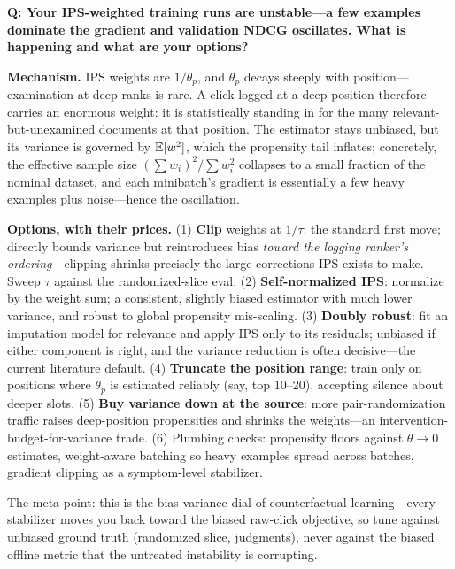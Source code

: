 \begin{interviewq}
\textbf{Q: Your IPS-weighted training runs are unstable---a few examples dominate the gradient and validation NDCG oscillates. What is happening and what are your options?}

 \quad {} \quad \badgefreq{\freqlow}

\stronganswer

\textbf{Mechanism.} IPS weights are $1/\theta_p$, and $\theta_p$ decays steeply with position---examination at deep ranks is rare. A click logged at a deep position therefore carries an enormous weight: it is statistically standing in for the many relevant-but-unexamined documents at that position. The estimator stays unbiased, but its variance is governed by $\operatorname{\mathbb{E}}[w^2]$, which the propensity tail inflates; concretely, the effective sample size $(\sum w_i)^2 / \sum w_i^2$ collapses to a small fraction of the nominal dataset, and each minibatch's gradient is essentially a few heavy examples plus noise---hence the oscillation.

\textbf{Options, with their prices.} (1) \textbf{Clip} weights at $1/\tau$: the standard first move; directly bounds variance but reintroduces bias \textit{toward the logging ranker's ordering}---clipping shrinks precisely the large corrections IPS exists to make. Sweep $\tau$ against the randomized-slice eval. (2) \textbf{Self-normalized IPS}: normalize by the weight sum; a consistent, slightly biased estimator with much lower variance, and robust to global propensity mis-scaling. (3) \textbf{Doubly robust}: fit an imputation model for relevance and apply IPS only to its residuals; unbiased if either component is right, and the variance reduction is often decisive---the current literature default. (4) \textbf{Truncate the position range}: train only on positions where $\theta_p$ is estimated reliably (say, top 10--20), accepting silence about deeper slots. (5) \textbf{Buy variance down at the source}: more pair-randomization traffic raises deep-position propensities and shrinks the weights---an intervention-budget-for-variance trade. (6) Plumbing checks: propensity floors against $\theta \to 0$ estimates, weight-aware batching so heavy examples spread across batches, gradient clipping as a symptom-level stabilizer.

The meta-point: this is the bias-variance dial of counterfactual learning---every stabilizer moves you back toward the biased raw-click objective, so tune against unbiased ground truth (randomized slice, judgments), never against the biased offline metric that the untreated instability is corrupting.


\end{interviewq}
